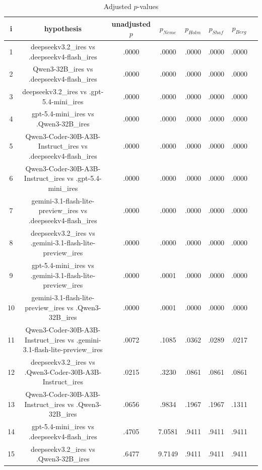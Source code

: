 \documentclass[a4paper,10pt]{article}
\begin{document}
\begin{landscape}
\begin{table}[!htp]
\centering\tiny
\caption{Adjusted $p$-values}
\begin{tabular}{cccccccc}
i&hypothesis&unadjusted $p$&$p_{Neme}$&$p_{Holm}$&$p_{Shaf}$&$p_{Berg}$\\
\hline
1&deepseekv3.2_ires vs .deepseekv4-flash_ires&.0000&.0000&.0000&.0000&.0000\\2&Qwen3-32B_ires vs .deepseekv4-flash_ires&.0000&.0000&.0000&.0000&.0000\\3&deepseekv3.2_ires vs .gpt-5.4-mini_ires&.0000&.0000&.0000&.0000&.0000\\4&gpt-5.4-mini_ires vs .Qwen3-32B_ires&.0000&.0000&.0000&.0000&.0000\\5&Qwen3-Coder-30B-A3B-Instruct_ires vs .deepseekv4-flash_ires&.0000&.0000&.0000&.0000&.0000\\6&Qwen3-Coder-30B-A3B-Instruct_ires vs .gpt-5.4-mini_ires&.0000&.0000&.0000&.0000&.0000\\7&gemini-3.1-flash-lite-preview_ires vs .deepseekv4-flash_ires&.0000&.0000&.0000&.0000&.0000\\8&deepseekv3.2_ires vs .gemini-3.1-flash-lite-preview_ires&.0000&.0000&.0000&.0000&.0000\\9&gpt-5.4-mini_ires vs .gemini-3.1-flash-lite-preview_ires&.0000&.0001&.0000&.0000&.0000\\10&gemini-3.1-flash-lite-preview_ires vs .Qwen3-32B_ires&.0000&.0001&.0000&.0000&.0000\\11&Qwen3-Coder-30B-A3B-Instruct_ires vs .gemini-3.1-flash-lite-preview_ires&.0072&.1085&.0362&.0289&.0217\\12&deepseekv3.2_ires vs .Qwen3-Coder-30B-A3B-Instruct_ires&.0215&.3230&.0861&.0861&.0861\\13&Qwen3-Coder-30B-A3B-Instruct_ires vs .Qwen3-32B_ires&.0656&.9834&.1967&.1967&.1311\\14&gpt-5.4-mini_ires vs .deepseekv4-flash_ires&.4705&7.0581&.9411&.9411&.9411\\15&deepseekv3.2_ires vs .Qwen3-32B_ires&.6477&9.7149&.9411&.9411&.9411\\\hline
\end{tabular}
\end{table}

\end{landscape}
\end{document}
